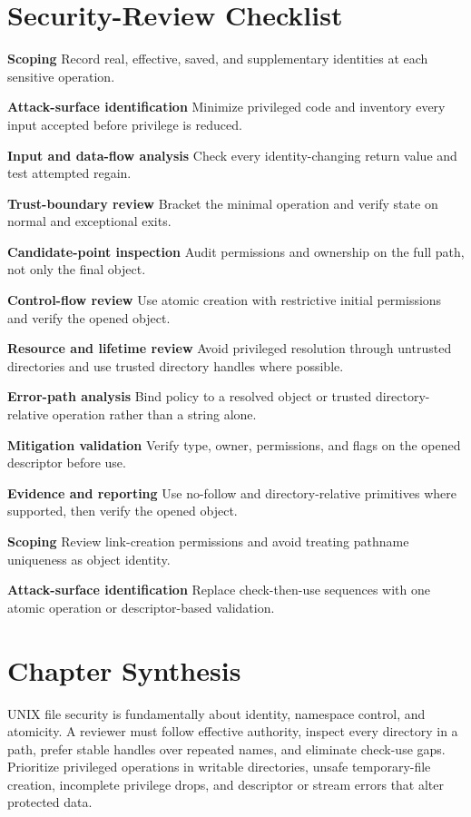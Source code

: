 \documentclass[11pt,letterpaper]{article}
\begin{document}
\section{Security-Review Checklist}
\begin{CornellChecklist}
\item \textbf{Scoping}
Record real, effective, saved, and supplementary identities at each sensitive operation.
\item \textbf{Attack-surface identification}
Minimize privileged code and inventory every input accepted before privilege is reduced.
\item \textbf{Input and data-flow analysis}
Check every identity-changing return value and test attempted regain.
\item \textbf{Trust-boundary review}
Bracket the minimal operation and verify state on normal and exceptional exits.
\item \textbf{Candidate-point inspection}
Audit permissions and ownership on the full path, not only the final object.
\item \textbf{Control-flow review}
Use atomic creation with restrictive initial permissions and verify the opened object.
\item \textbf{Resource and lifetime review}
Avoid privileged resolution through untrusted directories and use trusted directory handles where possible.
\item \textbf{Error-path analysis}
Bind policy to a resolved object or trusted directory-relative operation rather than a string alone.
\item \textbf{Mitigation validation}
Verify type, owner, permissions, and flags on the opened descriptor before use.
\item \textbf{Evidence and reporting}
Use no-follow and directory-relative primitives where supported, then verify the opened object.
\item \textbf{Scoping}
Review link-creation permissions and avoid treating pathname uniqueness as object identity.
\item \textbf{Attack-surface identification}
Replace check-then-use sequences with one atomic operation or descriptor-based validation.
\end{CornellChecklist}
\section{Chapter Synthesis}
UNIX file security is fundamentally about identity, namespace control, and atomicity. A reviewer must follow effective authority, inspect every directory in a path, prefer stable handles over repeated names, and eliminate check-use gaps. Prioritize privileged operations in writable directories, unsafe temporary-file creation, incomplete privilege drops, and descriptor or stream errors that alter protected data.
\end{document}
